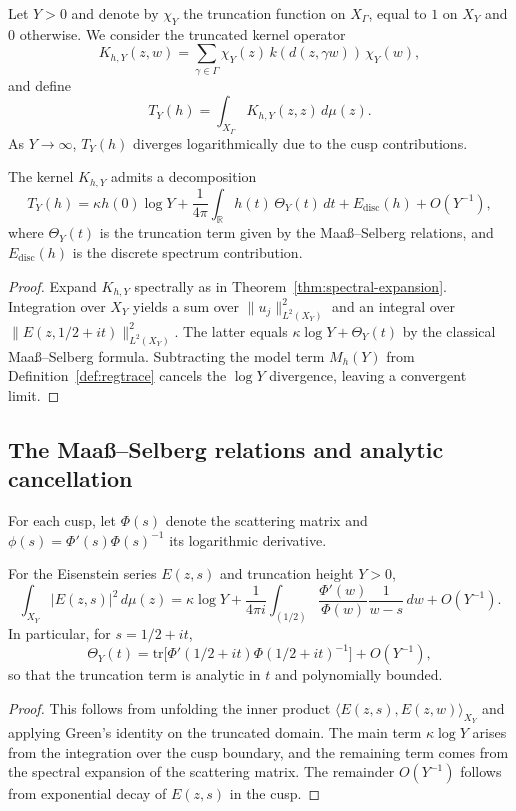 Let $Y>0$ and denote by $\chi_Y$ the truncation function on $X_\Gamma$, equal to $1$ on $X_Y$ and $0$ otherwise.  
We consider the truncated kernel operator
\[
K_{h,Y}(z,w) = \sum_{\gamma\in\Gamma} \chi_Y(z)\,k(d(z,\gamma w))\,\chi_Y(w),
\]
and define
\[
T_Y(h) = \int_{X_\Gamma} K_{h,Y}(z,z)\,d\mu(z).
\]
As $Y\to\infty$, $T_Y(h)$ diverges logarithmically due to the cusp contributions.

\begin{lemma}
\label{lem:cusp-model}
The kernel $K_{h,Y}$ admits a decomposition
\[
T_Y(h) = \kappa h(0)\log Y
+ \frac{1}{4\pi}\int_{\mathbb{R}} h(t)\,\Theta_Y(t)\,dt
+ E_{\mathrm{disc}}(h) + O(Y^{-1}),
\]
where $\Theta_Y(t)$ is the truncation term given by the Maaß–Selberg relations, and $E_{\mathrm{disc}}(h)$ is the discrete spectrum contribution.
\end{lemma}

\begin{proof}\relax
Expand $K_{h,Y}$ spectrally as in Theorem~\ref{thm:spectral-expansion}.  
Integration over $X_Y$ yields a sum over $\|u_j\|_{L^2(X_Y)}^2$ and an integral over $\|E(z,1/2+it)\|_{L^2(X_Y)}^2$.  
The latter equals $\kappa\log Y + \Theta_Y(t)$ by the classical Maaß–Selberg formula.  
Subtracting the model term $M_h(Y)$ from Definition~\ref{def:regtrace} cancels the $\log Y$ divergence, leaving a convergent limit.
\end{proof}

\subsection{The Maaß–Selberg relations and analytic cancellation}
\label{subsec:ch4-part3-MaassSelberg}
\relax

For each cusp, let $\Phi(s)$ denote the scattering matrix and $\phi(s) = \Phi'(s)\Phi(s)^{-1}$ its logarithmic derivative.

\begin{proposition}
\label{prop:maass-selberg}
For the Eisenstein series $E(z,s)$ and truncation height $Y>0$,
\[
\int_{X_Y} |E(z,s)|^2\,d\mu(z)
= \kappa\log Y + \frac{1}{4\pi i}
\int_{(1/2)} \frac{\Phi'(w)}{\Phi(w)} \frac{1}{w-s}\,dw + O(Y^{-1}).
\]
In particular, for $s=1/2+it$,
\[
\Theta_Y(t) = \mathrm{tr}\big[\Phi'(1/2+it)\Phi(1/2+it)^{-1}\big] + O(Y^{-1}),
\]
so that the truncation term is analytic in $t$ and polynomially bounded.
\end{proposition}

\begin{proof}\relax
This follows from unfolding the inner product $\langle E(z,s),E(z,w)\rangle_{X_Y}$ and applying Green’s identity on the truncated domain.  
The main term $\kappa\log Y$ arises from the integration over the cusp boundary, and the remaining term comes from the spectral expansion of the scattering matrix.  
The remainder $O(Y^{-1})$ follows from exponential decay of $E(z,s)$ in the cusp.
\end{proof}

